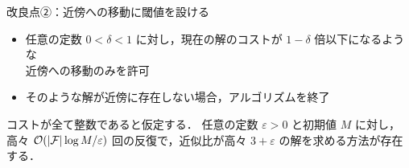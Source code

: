 \begin{frame}{改良点②：近傍への移動に閾値を設ける}
	\begin{itemize}
		\item 任意の定数 \(0 < \delta < 1\) に対し，現在の解のコストが \(1 - \delta\) 倍以下になるような\\近傍への移動のみを許可
		\item そのような解が近傍に存在しない場合，アルゴリズムを終了
	\end{itemize}

	\begin{lemma}[閾値付きの近傍探索による反復回数と近似比]
		コストが全て整数であると仮定する．
		任意の定数 \(\varepsilon > 0\) と初期値 \(M\) に対し，高々 \(\mathcal{O}(|\mathcal{F}| \log{M} / \varepsilon)\) 回の反復で，近似比が高々 \(3 + \varepsilon\) の解を求める方法が存在する．
	\end{lemma}

\end{frame}

